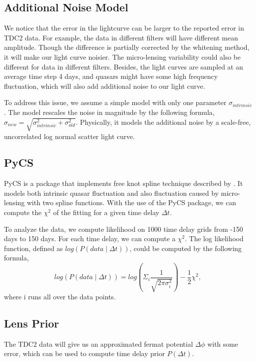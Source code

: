 \documentclass[\docopts]{\docclass}
\begin{document}
\subsection{Additional Noise Model}
We notice that the error in the lightcurve can be larger to the reported error in TDC2 data. For example, the data in different filters will have different mean amplitude. Though the difference is partially corrected by the whitening method, it will make our light curve noisier. The micro-lensing variability could also be different for data in different filters. Besides, the light curves are sampled at an average time step 4 days, and quasars might have some high frequency fluctuation, which will also add additional noise to our light curve.

To address this issue, we assume a simple model with only one parameter $\sigma_{intrinsic}$. The model rescales the noise in magnitude by the following formula, $\sigma_{new}=\sqrt{\sigma_{intrinsic}^2+\sigma_{old}^2}$.  Physically, it models the additional noise by a scale-free, uncorrelated log normal scatter light curve.

\subsection{PyCS}
PyCS is a package that implements free knot spline technique described by \cite{2013A&A...553A.120T}. It models both intrinsic quasar fluctuation and also fluctuation caused by micro-lensing with two spline functions. With the use of the PyCS package, we can compute the $\chi^2$ of the fitting for a given time delay $\Delta t$.

To analyze the data, we compute likelihood on 1000 time delay grids from -150 days to 150 days.  For each time delay, we can compute a $\chi^2$. The log likelihood function, defined as $log(P(data \mid \Delta t))$, could be computed by the following formula,
\begin{equation}
log(P(data \mid \Delta t))  = log (\Sigma_i  \frac{1}{\sqrt{2 \pi \sigma_i^2}} ) -\frac{1}{2} \chi^2,
\end{equation}
where i runs all over the data points.

\subsection{Lens Prior}
The TDC2 data will give us an approximated fermat potential $\Delta \phi$ with some error, which can be used to compute time delay prior $P(\Delta t)$.
\end{document}
